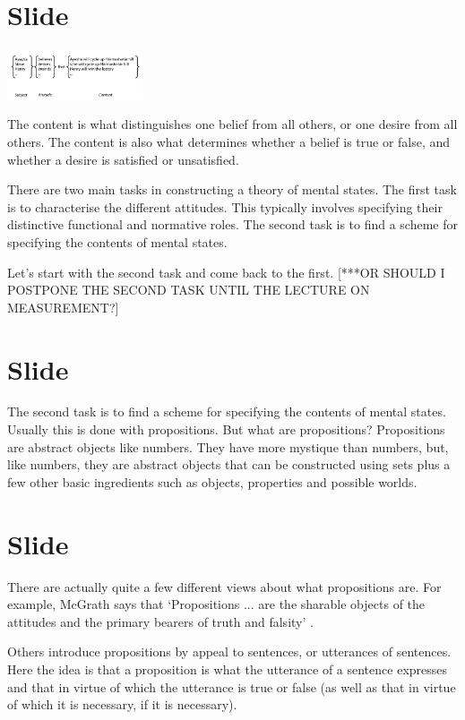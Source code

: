 \documentclass[12pt,\papersize]{extarticle}
\begin{document}
\section{Slide}

\begin{center}
  \includegraphics[width=0.3\textwidth]{fig4n.png}
\end{center}

The content is what distinguishes one belief from all others, or one desire from all others.
The content is also what determines whether a belief is true or false, and whether a desire is satisfied or unsatisfied.

There are two main tasks in constructing a theory of mental states. 
The first task is to characterise the different attitudes.
This typically involves specifying their distinctive functional and normative roles.
The second task is to find a scheme for specifying the contents of mental states.

Let’s start with the second task and come back to the first.  [***OR SHOULD I POSTPONE THE SECOND TASK UNTIL THE LECTURE ON MEASUREMENT?]


\section{Slide}
The second task is to find a scheme for specifying the contents of mental states.
Usually this is done with propositions.
But what are propositions?
Propositions are abstract objects like numbers.
They have more mystique than numbers, but, like numbers, they are abstract objects that can be constructed using sets plus a few other basic ingredients such as objects, properties and possible worlds.



\section{Slide}
There are actually quite a few different views about what propositions are.
For example, McGrath says that ‘Propositions ... are the sharable objects of the attitudes and the primary bearers of truth and falsity’ \citep{McGrath:2012pro}.

Others introduce propositions by appeal to sentences, or utterances of sentences.  Here the idea is that a proposition is what the utterance of a sentence expresses and that in virtue of which the utterance is true or false (as well as that in virtue of which it is necessary, if it is necessary). \citep{King:2011pro}
\end{document}
